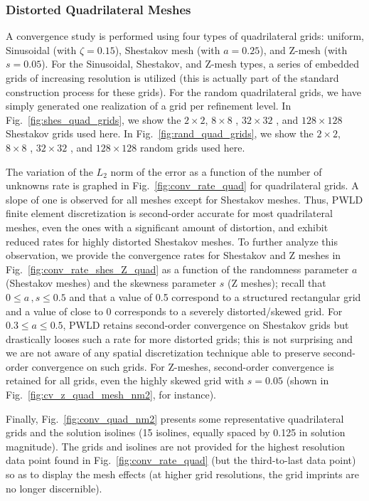 \documentclass[preprint,10pt]{elsarticle}
\newcommand{\fig}[1]{Fig.~\ref{#1}}                      %
\begin{document}
\subsubsection{Distorted Quadrilateral Meshes} \label{sec:results_conv_quad}

A convergence study is performed using four types of quadrilateral grids: uniform, Sinusoidal (with $\zeta=0.15$), Shestakov mesh (with $a=0.25$), and Z-mesh (with $s=0.05$).
For the Sinusoidal, Shestakov, and Z-mesh types, a series of embedded grids of increasing resolution is utilized (this is actually part of the standard construction process for these grids). For the random quadrilateral grids, we have simply generated one realization of a grid per refinement level.  In \fig{fig:shes_quad_grids}, we show the $2 \times 2$, $8 \times 8$ , $32 \times 32$ , and $128\times 128$ Shestakov grids used here. 
 In \fig{fig:rand_quad_grids}, we show the $2 \times 2$, $8 \times 8$ , $32 \times 32$ , and $128\times 128$ random grids used here. 

The  variation of the $L_2$ norm of the error as a function of the number of unknowns rate is graphed in \fig{fig:conv_rate_quad} for quadrilateral grids. A slope of one is observed for all meshes except for Shestakov meshes. Thus, PWLD finite element discretization is second-order accurate for most quadrilateral meshes, even the ones with a significant amount of distortion, and exhibit reduced rates for highly distorted Shestakov meshes.
To further analyze this observation, we provide the convergence rates for Shestakov and Z meshes in \fig{fig:conv_rate_shes_Z_quad} as a function of the randomness parameter $a$ (Shestakov meshes) and the skewness parameter $s$ (Z meshes); recall that $0 \le a\, , s \le 0.5$ and that a value of 0.5 correspond to a structured rectangular grid and a value of close to 0 corresponds to a severely distorted/skewed grid. For $0.3 \le a \le 0.5$, PWLD retains second-order convergence on Shestakov grids but drastically looses such a rate for more distorted grids; this is not surprising and we are not aware of any spatial discretization technique able to preserve second-order convergence on such grids. For Z-meshes, second-order convergence is retained for all grids, even the highly skewed grid with $s=0.05$ (shown in \fig{fig:cv_z_quad_mesh_nm2}, for instance).

Finally, \fig{fig:conv_quad_nm2} presents some representative quadrilateral grids and the solution isolines (15 isolines, equally spaced by 0.125 in solution magnitude). The grids and isolines are not provided for the highest resolution data point found in \fig{fig:conv_rate_quad} (but the third-to-last data point) so as to display the mesh effects (at higher grid resolutions, the grid imprints are no longer discernible).
\end{document}
